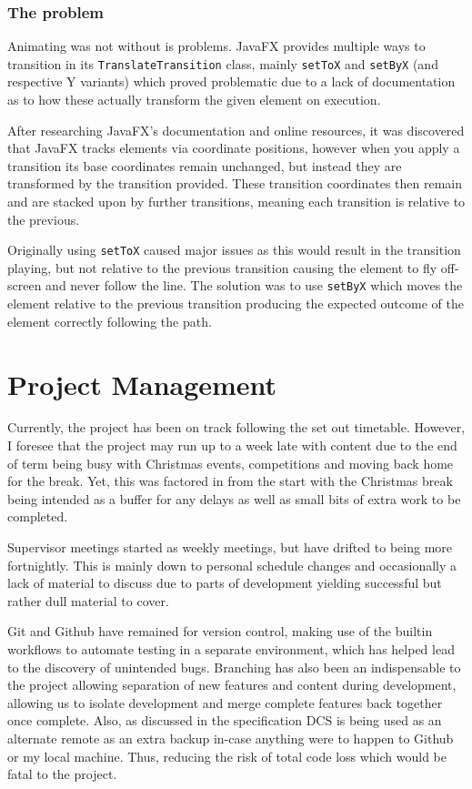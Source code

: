 \documentclass[a4paper,fleqn,twoside,12pt]{article}
\begin{document}
\subsubsection{The problem}
Animating was not without is problems. JavaFX provides multiple ways to transition in its \verb|TranslateTransition| class, mainly \verb|setToX| and \verb|setByX| (and respective Y variants) which proved problematic due to a lack of documentation as to how these actually transform the given element on execution. 

After researching JavaFX's documentation and online resources, it was discovered that JavaFX tracks elements via coordinate positions, however when you apply a transition its base coordinates remain unchanged, but instead they are transformed by the transition provided. These transition coordinates then remain and are stacked upon by further transitions, meaning each transition is relative to the previous.

Originally using \verb|setToX| caused major issues as this would result in the transition playing, but not relative to the previous transition causing the element to fly off-screen and never follow the line. The solution was to use \verb|setByX| which moves the element relative to the previous transition producing the expected outcome of the element correctly following the path.

\section{Project Management}
Currently, the project has been on track following the set out timetable. However, I foresee that the project may run up to a week late with content due to the end of term being busy with Christmas events, competitions and moving back home for the break. Yet, this was factored in from the start with the Christmas break being intended as a buffer for any delays as well as small bits of extra work to be completed.

Supervisor meetings started as weekly meetings, but have drifted to being more fortnightly. This is mainly down to personal schedule changes and occasionally a lack of material to discuss due to parts of development yielding successful but rather dull material to cover.

Git and Github have remained for version control, making use of the builtin workflows to automate testing in a separate environment, which has helped lead to the discovery of unintended bugs. Branching has also been an indispensable to the project allowing separation of new features and content during development, allowing us to isolate development and merge complete features back together once complete. Also, as discussed in the specification DCS is being used as an alternate remote as an extra backup in-case anything were to happen to Github or my local machine. Thus, reducing the risk of total code loss which would be fatal to the project.
\end{document}
